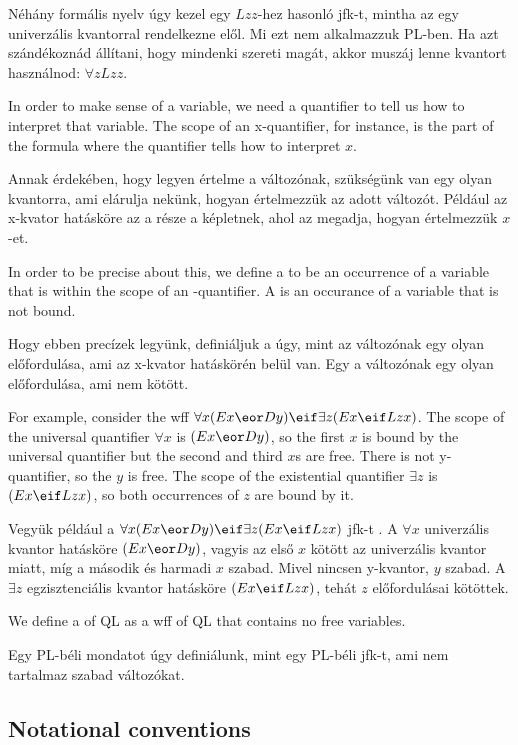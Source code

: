 Néhány formális nyelv úgy kezel egy $Lzz$-hez hasonló jfk-t, mintha az egy univerzális kvantorral rendelkezne elől. Mi ezt nem alkalmazzuk PL-ben. Ha azt szándékoznád állítani, hogy mindenki szereti magát, akkor muszáj lenne kvantort használnod: $\forall zLzz$.

In order to make sense of a variable, we need a quantifier to tell us how to interpret that variable. The scope of an x-quantifier, for instance, is the part of the formula where the quantifier tells how to interpret $x$.

Annak érdekében, hogy legyen értelme a változónak, szükségünk van egy olyan kvantorra, ami elárulja nekünk, hogyan értelmezzük az adott változót. Például az x-kvator hatásköre az a része a képletnek, ahol az megadja, hogyan értelmezzük $x$-et.

In order to be precise about this, we define a  to be an occurrence of a variable  that is within the scope of an -quantifier. A  is an occurance of a variable that is not bound.

Hogy ebben precízek legyünk, definiáljuk a  úgy, mint az  változónak egy olyan előfordulása, ami az x-kvator hatáskörén belül van. Egy  a változónak egy olyan előfordulása, ami nem kötött.

For example, consider the wff $\forall x(Ex \eor Dy) \eif \exists z(Ex \eif Lzx)$. The scope of the universal quantifier $\forall x$ is $(Ex \eor Dy)$, so the first $x$ is bound by the universal quantifier but the second and third $x$s are free. There is not y-quantifier, so the $y$ is free. The scope of the existential quantifier $\exists z$ is $(Ex \eif Lzx)$, so both occurrences of $z$ are bound by it.

Vegyük például a $\forall x(Ex \eor Dy) \eif \exists z(Ex \eif Lzx)$ jfk-t . A $\forall x$ univerzális  kvantor hatásköre $(Ex \eor Dy)$, vagyis az első $x$ kötött az univerzális kvantor miatt, míg a második és harmadi $x$ szabad. Mivel nincsen y-kvantor, $y$ szabad. A $\exists z$ egzisztenciális kvantor hatásköre $(Ex \eif Lzx)$, tehát $z$ előfordulásai kötöttek.

We define a  of QL as a wff of QL that contains no free variables.

Egy PL-béli mondatot úgy definiálunk, mint egy PL-béli jfk-t, ami nem tartalmaz szabad változókat.

\subsection*{Notational conventions}
